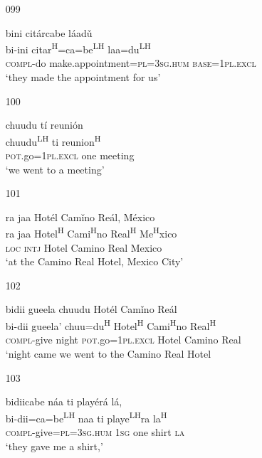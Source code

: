 \begin{itemize}
\item[099]
 
\glll   bini cit\'{a}rcabe l\'{a}ad\v{u}\\
bi-ini citar\textsuperscript{H}=ca=be\textsuperscript{LH}  laa=du\textsuperscript{LH} \\
\textsc{compl}-do make.appointment=\textsc{pl}=\textsc{3sg.hum} \textsc{base}=\textsc{1pl.excl}\\
\glt `they made the appointment for us' 
 


\item[100]
 
\glll   chuudu t\'{i} reuni\'{o}n\\
chuudu\textsuperscript{LH}  ti reunion\textsuperscript{H} \\
\textsc{pot}.go=\textsc{1pl.excl} one meeting\\
\glt `we went to a meeting'
 

\item[101]
 
\glll   ra jaa Hot\'{e}l Cam\v{i}no Re\'{a}l, M\'{e}xico\\
 ra jaa Hotel\textsuperscript{H} Cami\textsuperscript{H}no Real\textsuperscript{H} Me\textsuperscript{H}xico\\
 \textsc{loc} \textsc{intj} Hotel Camino Real Mexico\\
\glt `at the Camino Real Hotel, Mexico City'
 


\item[102]

\glll   bidii gueela chuudu Hot\'{e}l Cam\v{i}no Re\'{a}l \\
 bi-dii gueela' chuu=du\textsuperscript{H} Hotel\textsuperscript{H} Cami\textsuperscript{H}no Real\textsuperscript{H}\\ 
 \textsc{compl}-give night  \textsc{pot}.go=\textsc{1pl.excl} Hotel Camino Real \\
\glt `night came we went to the Camino Real Hotel
 

\item[103]
 
\glll   bidiicabe n\'{a}a ti play\'{e}r\'{a} l\'{a},\\
bi-dii=ca=be\textsuperscript{LH} naa ti playe\textsuperscript{LH}ra la\textsuperscript{H}\\
 \textsc{compl}-give=\textsc{pl}=\textsc{3sg.hum} \textsc{1sg} one shirt \textsc{la}\\
\glt `they gave me a shirt,'
 



\end{itemize}
